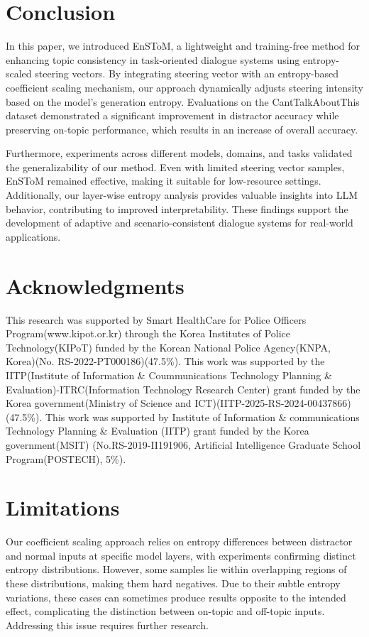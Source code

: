 \documentclass[11pt]{article}
\begin{document}
\section{Conclusion}

In this paper, we introduced EnSToM, a lightweight and training-free method for enhancing topic consistency in task-oriented dialogue systems using entropy-scaled steering vectors. By integrating steering vector with an entropy-based coefficient scaling mechanism, our approach dynamically adjusts steering intensity based on the model's generation entropy. Evaluations on the CantTalkAboutThis dataset demonstrated a significant improvement in distractor accuracy while preserving on-topic performance, which results in an increase of overall accuracy.



Furthermore, experiments across different models, domains, and tasks validated the generalizability of our method. Even with limited steering vector samples, EnSToM remained effective, making it suitable for low-resource settings. Additionally, our layer-wise entropy analysis provides valuable insights into LLM behavior, contributing to improved interpretability. These findings support the development of adaptive and scenario-consistent dialogue systems for real-world applications.

\section*{Acknowledgments}
This research was supported by Smart HealthCare for Police Officers Program(www.kipot.or.kr) through the Korea Institutes of Police Technology(KIPoT) funded by the Korean National Police Agency(KNPA, Korea)(No. RS-2022-PT000186)(47.5\%). This work was supported by the IITP(Institute of Information \& Coummunications Technology Planning \& Evaluation)-ITRC(Information Technology Research Center) grant funded by the Korea government(Ministry of Science and ICT)(IITP-2025-RS-2024-00437866) (47.5\%). This work was supported by Institute of Information \& communications Technology Planning \& Evaluation (IITP) grant funded by the Korea government(MSIT) (No.RS-2019-II191906, Artificial Intelligence Graduate School Program(POSTECH), 5\%).

\section{Limitations}
Our coefficient scaling approach relies on entropy differences between distractor and normal inputs at specific model layers, with experiments confirming distinct entropy distributions. However, some samples lie within overlapping regions of these distributions, making them hard negatives. Due to their subtle entropy variations, these cases can sometimes produce results opposite to the intended effect, complicating the distinction between on-topic and off-topic inputs. Addressing this issue requires further research.
\end{document}

